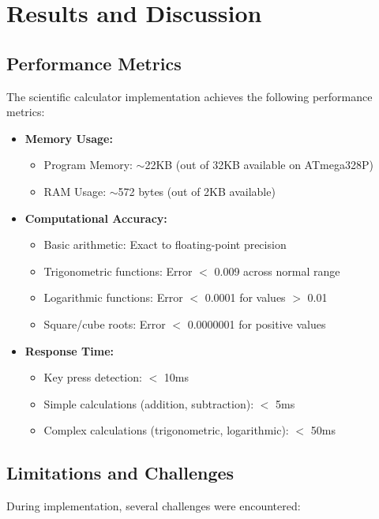 \documentclass[12pt]{article}
\begin{document}
\section{Results and Discussion}

\subsection{Performance Metrics}
The scientific calculator implementation achieves the following performance metrics:

\begin{itemize}
    \item \textbf{Memory Usage:}
    \begin{itemize}
        \item Program Memory: $\sim$22KB (out of 32KB available on ATmega328P)
        \item RAM Usage: $\sim$572 bytes (out of 2KB available)
    \end{itemize}

    \item \textbf{Computational Accuracy:}
    \begin{itemize}
        \item Basic arithmetic: Exact to floating-point precision
        \item Trigonometric functions: Error $<$ 0.009 across normal range
        \item Logarithmic functions: Error $<$ 0.0001 for values $>$ 0.01
        \item Square/cube roots: Error $<$ 0.0000001 for positive values
    \end{itemize}

    \item \textbf{Response Time:}
    \begin{itemize}
        \item Key press detection: $<$ 10ms
        \item Simple calculations (addition, subtraction): $<$ 5ms
        \item Complex calculations (trigonometric, logarithmic): $<$ 50ms
    \end{itemize}
\end{itemize}

\subsection{Limitations and Challenges}
During implementation, several challenges were encountered:
\end{document}
